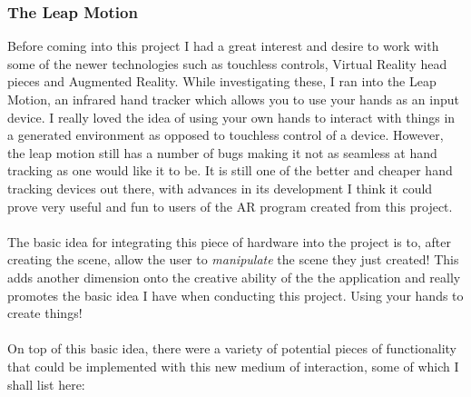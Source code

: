 \documentclass[11pt]{article}
\begin{document}
\subsubsection{The Leap Motion}
Before coming into this project I had a great interest and desire to work with
some of the newer technologies such as touchless controls, Virtual Reality 
head pieces and Augmented Reality. While investigating these, I ran into the
Leap Motion, an infrared hand tracker which allows you to use your hands as
an input device. I really loved the idea of using your own hands to interact
with things in a generated environment as opposed to touchless control of a device.
However, the leap motion still has a number of bugs making it not as 
seamless at  
hand tracking as one would like it to be. It is still one of the better and 
cheaper hand tracking devices out there, with advances in its development I think
it could prove very useful and fun to users of the AR program 
created from this project.\\
\\
The basic idea for integrating this piece of hardware into the project is to,
after creating the scene, allow the user to \textit{manipulate} the
scene they just created! This adds another dimension onto the creative
ability of the the application and really promotes the basic idea I have when
conducting this project. Using your hands to create things! \\
\\
On top of this basic idea, there were a variety of potential pieces of 
functionality that could be implemented with this new medium of 
interaction, some of which I shall list here:
\end{document}
